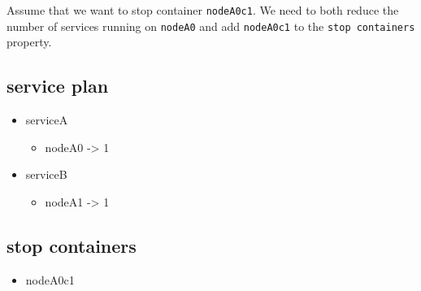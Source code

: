 \documentclass[12pt]{article}
\begin{document}
Assume that we want to stop container \texttt{nodeA0c1}.
We need to both reduce the number of services running on \texttt{nodeA0}
and add \texttt{nodeA0c1} to the \texttt{stop containers} property.

\subsection{service plan}

\begin{itemize}
\item serviceA
  \begin{itemize}
  \item nodeA0 -> 1
  \end{itemize}

\item serviceB
  \begin{itemize}
  \item nodeA1 -> 1
  \end{itemize}

\end{itemize}

\subsection{stop containers}
\begin{itemize}
\item nodeA0c1
  \end{itemize}
\end{document}
